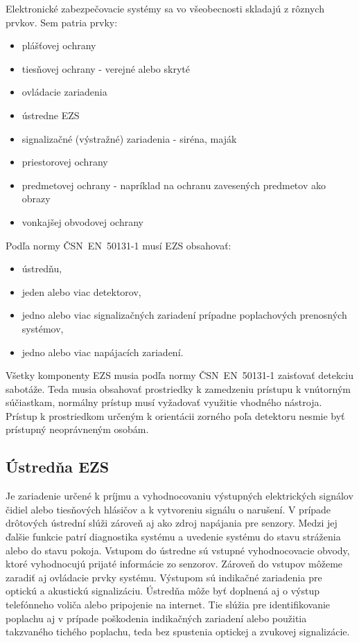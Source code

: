 Elektronické zabezpečovacie systémy sa vo všeobecnosti skladajú z rôznych prvkov. Sem patria prvky:\cite{velas_ezs}
\begin{itemize}
    \item plášťovej ochrany
    \item tiesňovej ochrany - verejné alebo skryté
    \item ovládacie zariadenia
    \item ústredne EZS
    \item signalizačné (výstražné) zariadenia - siréna, maják
    \item priestorovej ochrany
    \item predmetovej ochrany - napríklad na ochranu zavesených predmetov ako obrazy
    \item vonkajšej obvodovej ochrany
\end{itemize}
Podľa normy ČSN~EN~50131-1 musí EZS obsahovať:
\begin{itemize}
    \item ústredňu, 
    \item jeden alebo viac detektorov,
    \item jedno alebo viac signalizačných zariadení prípadne poplachových prenosných systémov,
    \item jedno alebo viac napájacích zariadení. 
\end{itemize}

Všetky komponenty EZS musia podľa normy ČSN~EN~50131-1 zaisťovať detekciu sabotáže. Teda musia obsahovať prostriedky k zamedzeniu prístupu k vnútorným súčiastkam, normálny prístup musí vyžadovať využitie vhodného nástroja. Prístup k prostriedkom určeným k orientácii zorného poľa detektoru nesmie byť prístupný neoprávneným osobám.\cite{csn-en-50131-1}

\subsection{Ústredňa EZS}

Je zariadenie určené k príjmu a vyhodnocovaniu výstupných elektrických signálov čidiel alebo tiesňových hlásičov a k vytvoreniu signálu o narušení. V prípade drôtových ústrední slúži zároveň aj ako zdroj napájania pre senzory. Medzi jej ďalšie funkcie patrí diagnostika systému a uvedenie systému do stavu stráženia alebo do stavu pokoja. Vstupom do ústredne sú vstupné vyhodnocovacie obvody, ktoré vyhodnocujú prijaté informácie zo senzorov. Zároveň do vstupov môžeme zaradiť aj ovládacie prvky systému. Výstupom sú indikačné zariadenia pre optickú a akustickú signalizáciu. Ústredňa môže byť doplnená aj o výstup telefónneho voliča alebo pripojenie na internet. Tie slúžia pre identifikovanie poplachu aj v prípade poškodenia indikačných zariadení alebo použitia takzvaného tichého poplachu, teda bez spustenia optickej a zvukovej signalizácie.

